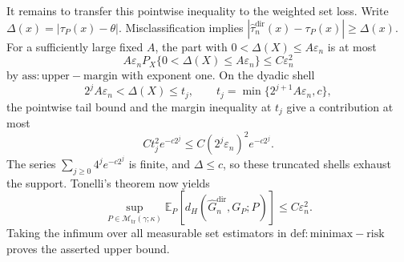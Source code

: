 It remains to transfer this pointwise inequality to the weighted set loss. Write \(\Delta(x)=|\tau_P(x)-\theta|\). Misclassification implies \(|\widehat\tau^{\mathrm{dir}}_n(x)-\tau_P(x)|\ge\Delta(x)\). For a sufficiently large fixed \(A\), the part with \(0<\Delta(X)\le A\varepsilon_n\) is at most
\[
 A\varepsilon_n P_X\{0<\Delta(X)\le A\varepsilon_n\}
 \le C\varepsilon_n^2
\]
by \(\mathrm{ass:upper-margin}\) with exponent one. On the dyadic shell
\[
 2^jA\varepsilon_n<\Delta(X)\le t_j,
 \qquad
 t_j=\min\{2^{j+1}A\varepsilon_n,c\},
\]
the pointwise tail bound and the margin inequality at \(t_j\) give a contribution at most
\[
 Ct_j^2e^{-c2^j}
 \le C(2^j\varepsilon_n)^2e^{-c2^j}.
\]
The series \(\sum_{j\ge0}4^je^{-c2^j}\) is finite, and \(\Delta\le c\), so these truncated shells exhaust the support. Tonelli's theorem now yields
\[
 \sup_{P\in\mathcal M_{\mathrm{tr}}(\gamma;\kappa)}
 \mathbb E_P[d_H(\widehat G_n^{\mathrm{dir}},G_P;P)]
 \le C\varepsilon_n^2.
\]
Taking the infimum over all measurable set estimators in \(\mathrm{def:minimax-risk}\) proves the asserted upper bound.